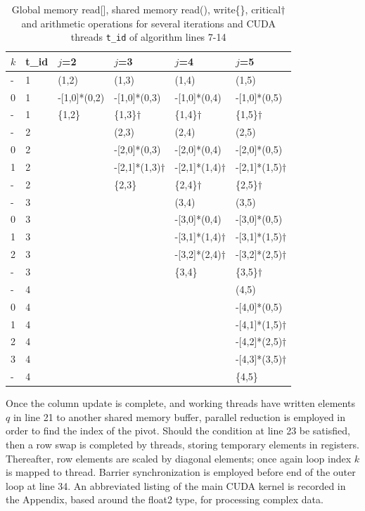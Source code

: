 \documentclass[letter, 12pt]{article}
\begin{document}
\begin{centering}
\begin{table}[h!]
\caption{Global memory read[], shared memory read(), write\{\}, critical$\dagger$ and arithmetic operations for several iterations and CUDA threads {\tt t\_id} of algorithm lines 7-14}
\begin{tabular}{llllll}
$k$ & t\_id 	& $j$=2 		& $j$=3 		& $j$=4 		& $j$=5 \\
\hline
- 	& 1	& (1,2)			& (1,3)			& (1,4) 		& (1,5) \\
0 	& 1 	& -[1,0]*(0,2) 		& -[1,0]*(0,3)		& -[1,0]*(0,4) 		& -[1,0]*(0,5) \\
-	& 1 	& \{1,2\} 		& \{1,3\}$\dagger$		& \{1,4\}$\dagger$ 		& \{1,5\}$\dagger$ \\
\hline
-	& 2	& 			& (2,3)			& (2,4) 		& (2,5) \\
0	& 2	&			& -[2,0]*(0,3)		& -[2,0]*(0,4) 		& -[2,0]*(0,5) \\
1	& 2 	&			& -[2,1]*(1,3)$\dagger$		& -[2,1]*(1,4)$\dagger$ 		& -[2,1]*(1,5)$\dagger$ \\
-	& 2 	&			& \{2,3\}		& \{2,4\}$\dagger$		& \{2,5\}$\dagger$ \\
\hline
-	& 3	&			&			& (3,4) 		& (3,5) \\
0	& 3	& 			& 			& -[3,0]*(0,4) 		& -[3,0]*(0,5) \\
1 	& 3	& 			& 			& -[3,1]*(1,4)$\dagger$ 		& -[3,1]*(1,5)$\dagger$ \\
2	& 3	& 			&			& -[3,2]*(2,4)$\dagger$ 		& -[3,2]*(2,5)$\dagger$ \\
-	& 3	& 			&			& \{3,4\} 		& \{3,5\}$\dagger$ \\
\hline
-	& 4	&			& 			& 			& (4,5) \\
0	& 4	&			&			&			& -[4,0]*(0,5) \\
1	& 4	&			&			&			& -[4,1]*(1,5)$\dagger$ \\
2	& 4	&			&			&			& -[4,2]*(2,5)$\dagger$ \\
3	& 4	&			&			&			& -[4,3]*(3,5)$\dagger$ \\
-	& 4	&			&			&			& \{4,5\} \\
\hline

\end{tabular}
\end{table}

\end{centering}


Once the column update is complete, and working threads have written elements $q$ in line 21 to another shared memory buffer, parallel reduction is employed in order to find the index of the pivot. Should the condition at line 23 be satisfied, then a row swap is completed by threads, storing temporary elements in registers. Thereafter, row elements are scaled by diagonal elements; once again loop index $k$ is mapped to thread. Barrier synchronization is employed before end of the outer loop at line 34. An abbreviated listing of the main CUDA kernel is recorded in the Appendix, based around the float2 type, for processing complex data.
\end{document}
